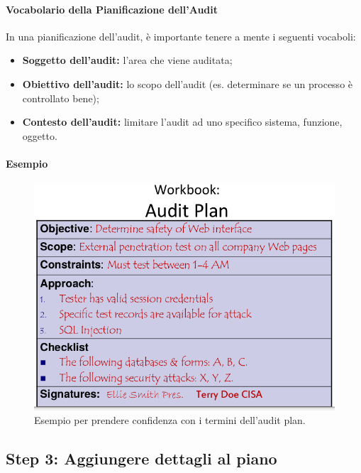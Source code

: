 \paragraph{Vocabolario della Pianificazione dell'Audit}

In una pianificazione dell'audit, è importante tenere a mente i seguenti
vocaboli:
\begin{itemize}
\item \textbf{Soggetto dell'audit:} l'area che viene auditata;
\item \textbf{Obiettivo dell'audit:} lo scopo dell'audit (es. determinare se un
processo è controllato bene);
\item \textbf{Contesto dell'audit:} limitare l'audit ad uno specifico sistema,
funzione, oggetto.
\end{itemize}


\paragraph*{Esempio}

\begin{figure}[H]
	\begin{center}
\includegraphics[scale=0.3]{res/img/audit_plan_vocabulary_example.png}
	\end{center}
	\caption{Esempio per prendere confidenza con i termini dell'audit plan.}
	\label{fig:audit:plan:vocabulary:example}
\end{figure}

\subsection{Step 3: Aggiungere dettagli al piano}

